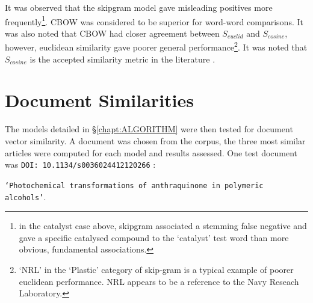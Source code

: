 It was observed that the skipgram model gave misleading positives more frequently\footnote{in the catalyst case above, skipgram associated a stemming false negative and gave a specific catalysed compound to the `catalyst' test word than more obvious, fundamental associations.}. CBOW  was considered to be superior for word-word comparisons. It was also noted that CBOW had closer agreement between $S_{euclid}$ and $S_{cosine}$, however, euclidean similarity gave poorer general performance\footnote{`NRL' in the `Plastic' category of skip-gram is a typical example of poorer euclidean performance. NRL appears to be a reference to the Navy Reseach Laboratory. }. It was noted that $S_{cosine}$ is the accepted similarity metric in the literature \cite{word2vec1}\cite{word2vec2}\cite{doc2vec}.

\section{Document Similarities}
The models detailed in \S\ref{chapt:ALGORITHM} were then tested for document vector similarity. A document was chosen from the corpus, the three most similar articles were computed for each model and results assessed. One test document was \texttt{DOI: 10.1134/s0036024412120266} \cite{docassay}:


\texttt{`Photochemical transformations of anthraquinone in polymeric alcohols'}.

